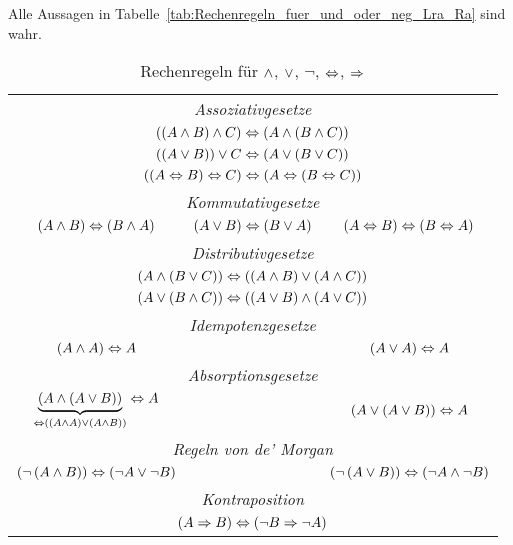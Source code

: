 \begin{theorem}
Alle Aussagen in Tabelle~\vref{tab:Rechenregeln_fuer_und_oder_neg_Lra_Ra} sind wahr.
\begin{table}[htb]
\centering
\begin{tabular}{ccc}
\toprule
\multicolumn{3}{c}{\emph{Assoziativgesetze}}\\
\multicolumn{3}{c}{$\left(\left(A \wedge B\right) \wedge C\right) \Leftrightarrow \left(A \wedge \left(B \wedge C\right)\right)$}\\
\multicolumn{3}{c}{$\left(\left(A \vee B\right)\right) \vee C \Leftrightarrow \left(A \vee \left(B \vee C\right)\right)$}\\
\multicolumn{3}{c}{$\left(\left(A \Leftrightarrow B\right) \Leftrightarrow C\right) \Leftrightarrow \left(A \Leftrightarrow \left(B \Leftrightarrow C\right)\right)$}\\
\midrule

\multicolumn{3}{c}{\emph{Kommutativgesetze}}\\
$\left(A \wedge B\right) \Leftrightarrow \left(B \wedge A\right)$ &
$\left(A \vee B\right) \Leftrightarrow \left(B \vee A\right)$ &
$\left(A \Leftrightarrow B\right) \Leftrightarrow \left(B \Leftrightarrow A\right)$\\
\midrule

\multicolumn{3}{c}{\emph{Distributivgesetze}}\\
\multicolumn{3}{c}{$\left(A \wedge \left(B \vee C\right)\right) \Leftrightarrow \left(\left(A \wedge B\right) \vee \left(A \wedge C\right)\right)$}\\
\multicolumn{3}{c}{$\left(A \vee \left(B \wedge C\right)\right) \Leftrightarrow \left(\left(A \vee B\right) \wedge \left(A \vee C\right)\right)$}\\
\midrule

\multicolumn{3}{c}{\emph{Idempotenzgesetze}}\\
$\left(A \wedge A\right) \Leftrightarrow A$ & & $\left(A \vee A\right) \Leftrightarrow A$\\
\midrule

\multicolumn{3}{c}{\emph{Absorptionsgesetze}}\\
$\underbrace{\left(A \wedge \left(A \vee B\right)\right)}_{\Leftrightarrow \left(\left(A \wedge A\right) \vee \left(A \wedge B\right)\right)} \Leftrightarrow A$ & & $\left(A \vee \left(A \vee B\right)\right) \Leftrightarrow A$\\
\midrule

\multicolumn{3}{c}{\emph{Regeln von de' Morgan}}\\
$\left(\neg \left(A \wedge B\right)\right) \Leftrightarrow \left(\neg A \vee \neg B\right)$ & & $\left(\neg \left(A \vee B\right)\right) \Leftrightarrow \left(\neg A \wedge \neg B\right)$\\
\midrule

\multicolumn{3}{c}{\emph{Kontraposition}}\\
\multicolumn{3}{c}{$\left(A \Rightarrow B\right) \Leftrightarrow \left(\neg B \Rightarrow \neg A\right)$}\\
\bottomrule
\end{tabular}
\label{tab:Rechenregeln_fuer_und_oder_neg_Lra_Ra}
\caption{Rechenregeln für $\wedge$, $\vee$, $\neg$, $\Leftrightarrow$, $\Rightarrow$}
\end{table}
\end{theorem}

